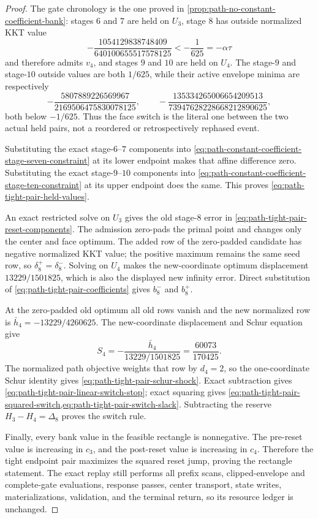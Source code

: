 \begin{proof}
The gate chronology is the one proved in
\cref{prop:path-no-constant-coefficient-bank}: stages $6$ and $7$ are held
on $U_3$, stage $8$ has outside normalized KKT value
\begin{equation*}
 -\frac{1054129838748409}{640100655517578125}
 <-\frac1{625}=-\alpha\tau
\end{equation*}
and therefore admits $v_4$, and stages $9$ and $10$ are held on $U_4$.
The stage-$9$ and stage-$10$ outside values are both $1/625$, while their
active envelope minima are respectively
\begin{equation*}
 -\frac{5807889226569967}{2169506475830078125},
 \qquad
 -\frac{135334265006654209513}{73947628228668212890625},
\end{equation*}
both below $-1/625$.  Thus the face switch is the literal one between the two
actual held pairs, not a reordered or retrospectively rephased event.

Substituting the exact stage-$6$--$7$ components into
\cref{eq:path-constant-coefficient-stage-seven-constraint} at its lower
endpoint makes that affine difference zero.  Substituting the exact
stage-$9$--$10$ components into
\cref{eq:path-constant-coefficient-stage-ten-constraint} at its upper
endpoint does the same.  This proves
\cref{eq:path-tight-pair-held-values}.

An exact restricted solve on $U_3$ gives the old stage-$8$ error in
\cref{eq:path-tight-pair-reset-components}.  The admission zero-pads the
primal point and changes only the center and face optimum.  The added row of
the zero-padded candidate has negative normalized KKT value; the positive
maximum remains the same seed row, so $\delta_8^+=\delta_8^-$.  Solving on
$U_4$ makes the new-coordinate optimum displacement $13229/1501825$, which
is also the displayed new infinity error.  Direct substitution of
\cref{eq:path-tight-pair-coefficients} gives $b_8^-$ and $b_8^+$.

At the zero-padded old optimum all old rows vanish and the new normalized row
is $\bar h_4=-13229/4260625$.  The new-coordinate displacement and Schur
equation give
\begin{equation*}
 S_4=-\frac{\bar h_4}{13229/1501825}=\frac{60073}{170425}.
\end{equation*}
The normalized path objective
weights that row by $d_4=2$, so the one-coordinate Schur identity gives
\cref{eq:path-tight-pair-schur-shock}.  Exact subtraction gives
\cref{eq:path-tight-pair-linear-switch-stop}; exact squaring gives
\cref{eq:path-tight-pair-squared-switch,eq:path-tight-pair-switch-slack}.
Subtracting the reserve $H_3-H_4=\Delta_8$ proves the switch rule.

Finally, every bank value in the feasible rectangle is nonnegative.  The
pre-reset value is increasing in $c_3$, and the post-reset value is increasing
in $c_4$.  Therefore the tight endpoint pair maximizes the squared reset
jump, proving the rectangle statement.  The exact replay still performs all
prefix scans, clipped-envelope and complete-gate evaluations, response
passes, center transport, state writes, materializations, validation, and
the terminal return, so its resource ledger is unchanged.
\end{proof}

